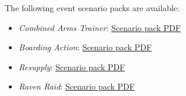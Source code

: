 The following event scenario packs are available:

\begin{itemize}

\item \emph{Combined Arms Trainer}: \href{https://raw.githubusercontent.com/Eudicods/outworlds-wastes/rules-pdf/combined-arms-trainer.pdf}{Scenario pack PDF}

\item \emph{Boarding Action}: \href{https://raw.githubusercontent.com/Eudicods/outworlds-wastes/rules-pdf/boarding-action.pdf}{Scenario pack PDF}

\item \emph{Resupply}: \href{https://raw.githubusercontent.com/Eudicods/outworlds-wastes/rules-pdf/resupply.pdf}{Scenario pack PDF}

\item \emph{Raven Raid}: \href{https://raw.githubusercontent.com/Eudicods/outworlds-wastes/rules-pdf/raven-raid.pdf}{Scenario pack PDF}

\end{itemize}
